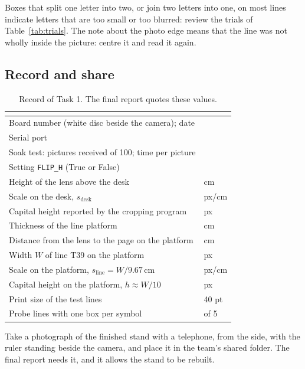 \begin{iffail}
Boxes that split one letter into two, or join two letters into one, on most lines indicate
letters that are too small or too blurred: review the trials of Table~\ref{tab:trials}. The
note about the photo edge means that the line was not wholly inside the picture: centre it and
read it again.
\end{iffail}

\subsection{Record and share}
\label{sec:t1record}

\begin{table}[H]
\centering
\begin{tabular}{L{7.0cm}C{4.2cm}}
\toprule
{} &  \\
\midrule
Board number (white disc beside the camera); date & \\
Serial port & \\
Soak test: pictures received of 100; time per picture & \\
Setting \texttt{FLIP\_H} (True or False) & \\
Height of the lens above the desk & \hfill cm \\
Scale on the desk, $s_{\text{desk}}$ & \hfill px/cm \\
Capital height reported by the cropping program & \hfill px \\
Thickness of the line platform & \hfill cm \\
Distance from the lens to the page on the platform & \hfill cm \\
Width $W$ of line T39 on the platform & \hfill px \\
Scale on the platform, $s_{\text{line}} = W / 9.67$\,cm & \hfill px/cm \\
Capital height on the platform, $h \approx W/10$ & \hfill px \\
Print size of the test lines & 40 pt \\
Probe lines with one box per symbol & \hfill of 5 \\
\bottomrule
\end{tabular}
\caption{Record of Task 1. The final report quotes these values.}
\label{tab:t1record}
\end{table}

Take a photograph of the finished stand with a telephone, from the side, with the ruler standing
beside the camera, and place it in the team's shared folder. The final report needs it, and it
allows the stand to be rebuilt.

